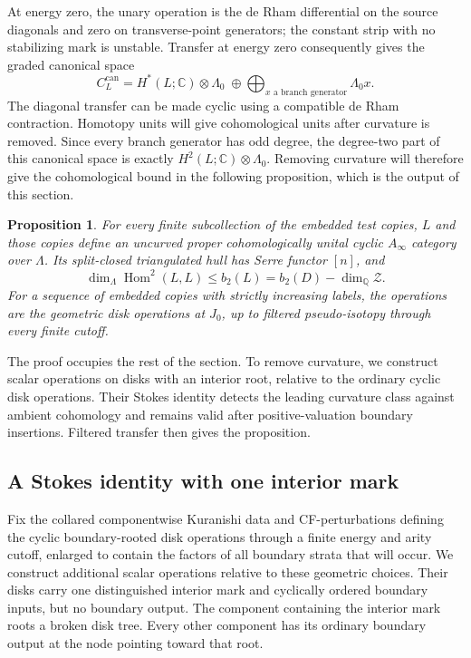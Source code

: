 \documentclass[11pt]{article}
\numberwithin{equation}{section}
\newtheorem{proposition}[theorem]{Proposition}
\theoremstyle{definition}
\theoremstyle{remark}
\newcommand{\Q}{\mathbb Q}
\newcommand{\C}{\mathbb C}
\DeclareMathOperator{\Hom}{Hom}
\begin{document}
At energy zero, the unary operation is the de Rham differential on
the source diagonals and zero on transverse-point generators; the
constant strip with no stabilizing mark is unstable.  Transfer at
energy zero consequently gives the graded canonical space
\begin{equation}\label{curv:canonical-space}
 C_L^{\mathrm{can}}
 =H^*(L;\C)\otimes\Lambda_0
   \;\oplus\!\!\bigoplus_{x\text{ a branch generator}}\!\Lambda_0 x.
\end{equation}
The diagonal transfer can be made cyclic using a compatible de Rham
contraction.  Homotopy units will give cohomological units after
curvature is removed.  Since every branch generator has odd degree,
the degree-two part of this canonical space is exactly
$H^2(L;\C)\otimes\Lambda_0$.  Removing curvature will therefore
give the cohomological bound in the following proposition, which is
the output of this section.

\begin{proposition}\label{prop:curvature}
For every finite subcollection of the embedded test copies, $L$ and
those copies define an uncurved proper cohomologically unital cyclic
$A_\infty$ category over $\Lambda$.  Its split-closed triangulated
hull has Serre functor $[n]$, and
\begin{equation}\label{curv:degree-two-bound}
 \dim_\Lambda \Hom^2(L,L)
 \leq b_2(L)=b_2(D)-\dim_\Q\mathcal Z.
\end{equation}
For a sequence of embedded copies with strictly increasing labels,
the operations are the geometric disk operations at $J_0$, up to
filtered pseudo-isotopy through every finite cutoff.
\end{proposition}

The proof occupies the rest of the section.  To remove curvature, we construct scalar operations on disks with
an interior root, relative to the ordinary cyclic disk operations.
Their Stokes identity detects the leading curvature class against
ambient cohomology and remains valid after positive-valuation
boundary insertions.  Filtered transfer then gives the proposition.

\subsection{A Stokes identity with one interior mark}

Fix the collared componentwise Kuranishi data and CF-perturbations
defining the cyclic boundary-rooted disk operations through a finite
energy and arity cutoff, enlarged to contain the factors of all
boundary strata that will occur.  We construct additional scalar
operations relative to these geometric choices.  Their disks carry one distinguished
interior mark and cyclically ordered boundary inputs, but no boundary
output.  The component containing the interior mark roots a broken
disk tree.  Every other component has its ordinary boundary output
at the node pointing toward that root.
\end{document}
